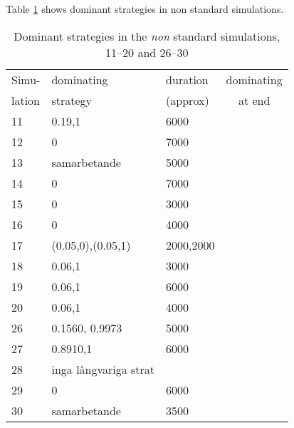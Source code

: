 

Table \ref{tab:results:dominant:11} shows dominant strategies in non standard simulations.

\begin{table}[!hbtp]
  \centering
  \caption{Dominant strategies in the \textit{non} standard simulations, 11--20 and
    26--30}
  \label{tab:results:dominant:11}
  \footnotesize
  \begin{tabular}{lllc}
    Simu-  & dominating & duration  & dominating \\
    lation & strategy   & (approx)  & at end \\
    \hline
11  &  0.19,1              & 6000      \\          
12  &  0                   & 7000               \\ 
13  &  samarbetande        & 5000               \\ 
14  &  0                   & 7000               \\ 
15  &  0                   & 3000               \\ 
16  &  0                   & 4000      \\          
17  &  (0.05,0),(0.05,1)   & 2000,2000 \\          
18  &  0.06,1              & 3000               \\ 
19  &  0.06,1              & 6000      \\          
20  &  0.06,1              & 4000      \\          
26  & 0.1560, 0.9973       & 5000\\          
27  & 0.8910,1             & 6000\\          
28  & inga långvariga strat&              \\ 
29  & 0                    & 6000\\          
30  & samarbetande         & 3500\\          
    \hline
  \end{tabular}
\end{table}


